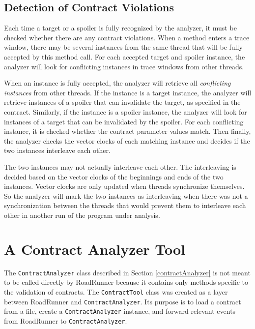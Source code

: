\subsection{Detection of Contract Violations}
\label{violations}

Each time a target or a spoiler is fully recognized by the analyzer, it must be
checked whether there are any contract violations. When a method enters a trace
window, there may be several instances from the same thread that will be fully
accepted by this method call. For each accepted target and spoiler instance, the
analyzer will look for conflicting instances in trace windows from other
threads.

When an instance is fully accepted, the analyzer will retrieve all
\emph{conflicting instances} from other threads. If the instance is a target
instance, the analyzer will retrieve instances of a spoiler that can invalidate
the target, as specified in the contract. Similarly, if the instance is a
spoiler instance, the analyzer will look for instances of a target that can be
invalidated by the spoiler. For each conflicting instance, it is checked whether
the contract parameter values match. Then finally, the analyzer checks the
vector clocks of each matching instance and decides if the two instances
interleave each other.

The two instances may not actually interleave each other. The interleaving is
decided based on the vector clocks of the beginnings and ends of the two
instances. Vector clocks are only updated when threads synchronize themselves.
So the analyzer will mark the two instances as interleaving when there was not
a synchronization between the threads that would prevent them to interleave each
other in another run of the program under analysis.


\section{A Contract Analyzer Tool}
\label{contractTool}

The \texttt{ContractAnalyzer} class described in Section \ref{contractAnalyzer}
is not meant to be called directly by RoadRunner because it contains only
methods specific to the validation of contracts. The \texttt{ContractTool} class
was created as a layer between RoadRunner and \texttt{ContractAnalyzer}. Its
purpose is to load a contract from a file, create a \texttt{ContractAnalyzer}
instance, and forward relevant events from RoadRunner to
\texttt{ContractAnalyzer}.

